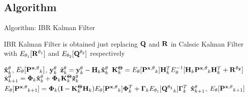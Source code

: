 \subsection{Algorithm}
\begin{frame}{Algorithm: IBR Kalman Filter}

IBR Kalman Filter is obtained just replacing ${\bf Q}$ and ${\bf R}$ in Calssic Kalman Filter with $E_{\theta_1}[{\bf R}^{\theta_1}]$ and $E_{\theta_2}[{\bf Q}^{\theta_2}]$ respectively

\begin{algorithm}[H]
\caption{IBR Kalman Filter}
\begin{algorithmic}[1]
\REQUIRE ${\bf \hat x}^{\theta}_k$, $E_\theta[{\bf P^{x, \theta}}_{k}]$, ${\bf y}^{\theta}_k$
\STATE $\tilde {\bf z}^{\bf \theta}_k = {\bf y}^{\bf \theta}_k - {\bf H}_k{\bf \hat x}^{\bf \theta}_k$
\STATE ${\bf K}^{\bf \Theta}_k = E_\theta[{\bf P^{x, \theta}}_k]{\bf H}^T_kE_\theta^{-1}[{\bf H}_k{\bf P^{x, \theta}}_k{\bf H}^T_k+{\bf R^{\theta_2}}]$
\STATE $\hat{\bf x}^{\theta}_{k+1} = {\bf \Phi}_k{\bf \hat x}^{\theta}_k+{\bf \Phi}_k{\bf K}^{\bf \Theta}_k{\bf \tilde z}^{\theta}_k$
\STATE $E_\theta[{\bf P^{x, \theta}}_{k+1}] = {\bf \Phi}_k({\bf I}-{\bf K}^{\bf \Theta}_k{\bf H}_k)E_\theta[{\bf P^{x, \theta}}_k]{\bf \Phi}^T_k + {\bf \Gamma}_kE_{\theta_1}[{\bf Q^{\theta_1}}_k]{\bf \Gamma}_k^T$
\ENSURE ${\bf \hat x}^{\theta}_{k+1}$, $E_\theta[{\bf P^{x, \theta}}_{k+1}]$
\end{algorithmic}
\end{algorithm}
\end{frame}
